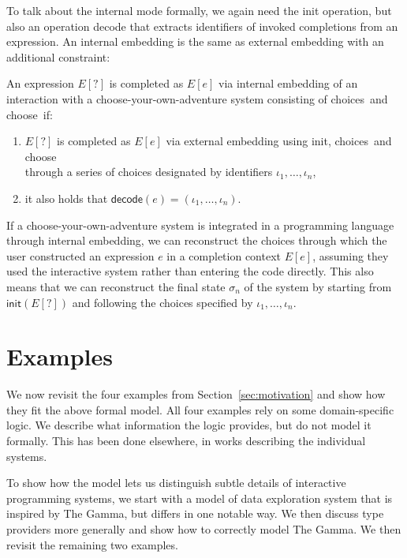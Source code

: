 \documentclass[a4paper,UKenglish,cleveref, autoref, thm-restate]{lipics-v2021}
\newcommand{\ident}[1]{\textsf{#1}}
\newcommand{\select}{\textnormal{\ident{choose}}}
\newcommand{\choices}{\textnormal{\ident{choices}}}
\begin{document}
To talk about the internal mode formally, we again need the \ident{init} operation, but also an
operation \ident{decode} that extracts identifiers of invoked completions from an expression.
An internal embedding is the same as external embedding with an additional constraint:

\begin{definition}\label{def:internal}
An expression $E[?]$ is completed as $E[e]$ via internal embedding of an interaction with
a choose-your-own-adventure system consisting of \choices\ and \select\ if:

\vspace{-0.5em}
\raggedright
\begin{enumerate}
\item $E[?]$ is completed as $E[e]$ via external embedding using \ident{init}, \choices\ and \select\\
  through a series of choices designated by identifiers $\iota_1, \ldots, \iota_n$,
\item it also holds that $\ident{decode}(e)=(\iota_1, \ldots, \iota_n)$.
\end{enumerate}
\end{definition}

If a choose-your-own-adventure system is integrated in a programming language
through internal embedding, we can reconstruct the choices through which the user constructed
an expression $e$ in a completion context $E[e]$, assuming they used the interactive system rather
than entering the code directly. This also means that we can reconstruct the final state $\sigma_n$
of the system by starting from $\ident{init}(E[?])$ and following the choices specified by
$\iota_1, \ldots, \iota_n$.


\newpage
\section{Examples}
\label{sec:examples}

We now revisit the four examples from Section~\ref{sec:motivation} and show how they fit the
above formal model. All four examples rely on some domain-specific logic. We describe what
information the logic provides, but do not model it formally. This has been done elsewhere,
in works describing the individual systems.

To show how the model lets us distinguish subtle details of interactive programming systems,
we start with a model of data exploration system that is inspired by The Gamma, but differs in
one notable way. We then discuss type providers more generally and show how to correctly model
The Gamma. We then revisit the remaining two examples.
\end{document}
